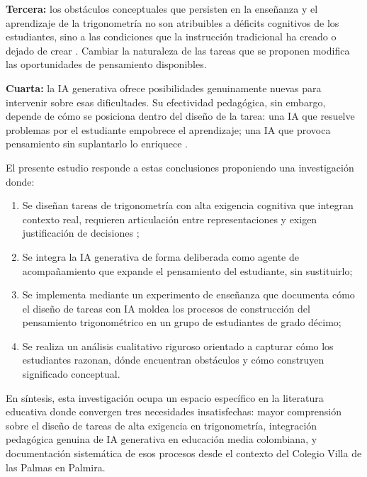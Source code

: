 \textbf{Tercera:} los obstáculos conceptuales que persisten en la enseñanza y el aprendizaje de la trigonometría no son atribuibles a déficits cognitivos de los estudiantes, sino a las condiciones que la instrucción tradicional ha creado o dejado de crear \parencite{arhinAnalysisHighSchool2021, fialloGutierrezCognitiveUnity2017}. Cambiar la naturaleza de las tareas que se proponen modifica las oportunidades de pensamiento disponibles.

\textbf{Cuarta:} la IA generativa ofrece posibilidades genuinamente nuevas para intervenir sobre esas dificultades. Su efectividad pedagógica, sin embargo, depende de cómo se posiciona dentro del diseño de la tarea: una IA que resuelve problemas por el estudiante empobrece el aprendizaje; una IA que provoca pensamiento sin suplantarlo lo enriquece \parencite{pepinMathematicsEducationEra2025, wardatChatGPTRevolutionaryTool2023}.

El presente estudio responde a estas conclusiones proponiendo una investigación donde:

\begin{enumerate}
\item Se diseñan tareas de trigonometría con alta exigencia cognitiva que integran contexto real, requieren articulación entre representaciones y exigen justificación de decisiones \parencite{radmehrTheoreticalFrameworkTask2023};
\item Se integra la IA generativa de forma deliberada como agente de acompañamiento que expande el pensamiento del estudiante, sin sustituirlo;
\item Se implementa mediante un experimento de enseñanza que documenta cómo el diseño de tareas con IA moldea los procesos de construcción del pensamiento trigonométrico en un grupo de estudiantes de grado décimo;
\item Se realiza un análisis cualitativo riguroso orientado a capturar cómo los estudiantes razonan, dónde encuentran obstáculos y cómo construyen significado conceptual.
\end{enumerate}

En síntesis, esta investigación ocupa un espacio específico en la literatura educativa donde convergen tres necesidades insatisfechas: mayor comprensión sobre el diseño de tareas de alta exigencia en trigonometría, integración pedagógica genuina de IA generativa en educación media colombiana, y documentación sistemática de esos procesos desde el contexto del Colegio Villa de las Palmas en Palmira.
